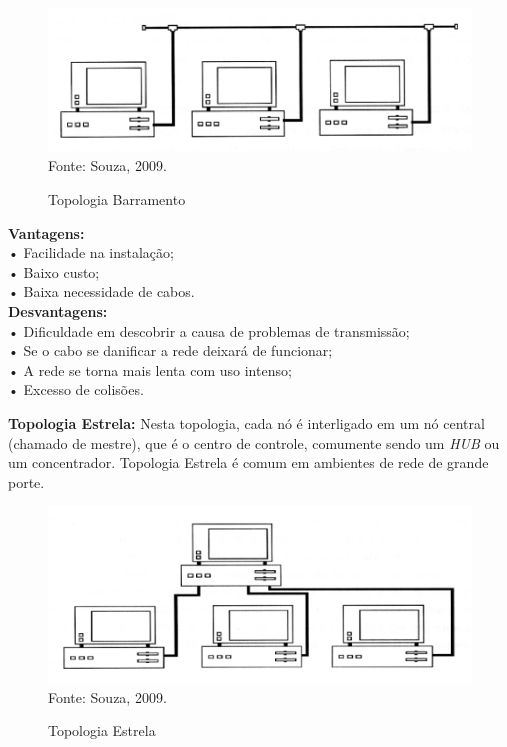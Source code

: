 \begin{figure}[htbp]
	\centering
	\caption{Topologia Barramento}
	\includegraphics[]{imagens/topologia-barramento.png}
	{\\Fonte: Souza, 2009.}
	\label{fig:criação_1}
\end{figure}

\textbf{Vantagens:}\\
• Facilidade na instalação;\\
• Baixo custo;\\
• Baixa necessidade de cabos.\\

\textbf{Desvantagens:}\\
• Dificuldade em descobrir a causa de problemas de transmissão;\\
• Se o cabo se danificar a rede deixará de funcionar;\\
• A rede se torna mais lenta com uso intenso;\\
• Excesso de colisões.\\


\newpage\thispagestyle{empty}
\par \textbf{Topologia Estrela:} Nesta topologia, cada nó é interligado em um nó central (chamado de mestre), que é o centro de controle, comumente sendo um \textit{HUB} ou um concentrador. Topologia Estrela é comum em ambientes de rede de grande porte.

\begin{figure}[htbp]
	\centering
	\caption{Topologia Estrela}
	\includegraphics[]{imagens/topologia-estrela.png}
	{\\Fonte: Souza, 2009.}
	\label{fig:criação_1}
\end{figure}


